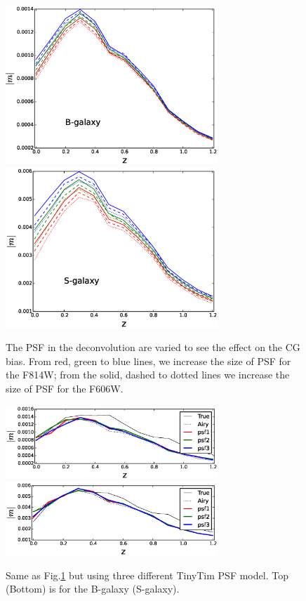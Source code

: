 \documentclass[useAMS,usenatbib]{mn2e}
\begin{document}
%
\begin{figure}
\includegraphics[width=8.0cm]{varpsfB.eps}
\includegraphics[width=8.0cm]{varpsfS.eps}
\caption{The PSF in the deconvolution are varied to see the effect on
  the CG bias.  From red, green to blue lines, we increase the size of
  PSF for the F814W; from the solid, dashed to dotted lines we
  increase the size of PSF for the F606W.  }
\label{fig:psfacc1}
\end{figure}
\begin{figure}
\includegraphics[width=8.0cm]{z_b_psfcomt.eps}
\includegraphics[width=8.0cm]{z_s_psfcomt.eps}
\caption{Same as Fig.\ref{fig:psfacc1} but using three different
  TinyTim PSF model. Top (Bottom) is for the B-galaxy (S-galaxy).}
\label{fig:psfacc2}
\end{figure}
%
\end{document}
